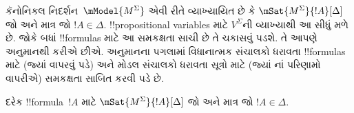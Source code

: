 \documentclass[../../../include/open-logic-section]{subfiles}
\begin{document}


કૅનોનિકલ નિદર્શન~$\mModel{M^\Sigma}$ એવી રીતે વ્યાખ્યાયિત છે કે
$\mSat{M^\Sigma}{!A}[\Delta]$ જો અને માત્ર જો $!A \in \Delta$.
!!{propositional
variable}s માટે $V^\Sigma$ની વ્યાખ્યાથી આ સીધું
મળે છે. જોકે બધાં !!{formula}s માટે આ સમકક્ષતા સાચી છે તે ચકાસવું
પડશે. તે આપણે અનુમાનથી કરીએ છીએ. અનુમાનના પગલામાં વિધાનાત્મક
સંચાલકો ધરાવતા !!{formula}s માટે (જ્યાં
 વાપરવું પડે) અને મોડલ સંચાલકો
ધરાવતા સૂત્રો માટે (જ્યાં નાં પરિણામો વાપરીએ)
સમકક્ષતા સાબિત કરવી પડે છે.

\begin{prop}[સત્યતા સહાયક પ્રમેય]
  દરેક !!{formula}~$!A$ માટે $\mSat{M^\Sigma}{!A}[\Delta]$ જો અને
  માત્ર જો $!A \in \Delta$.
\end{prop}
\end{document}

